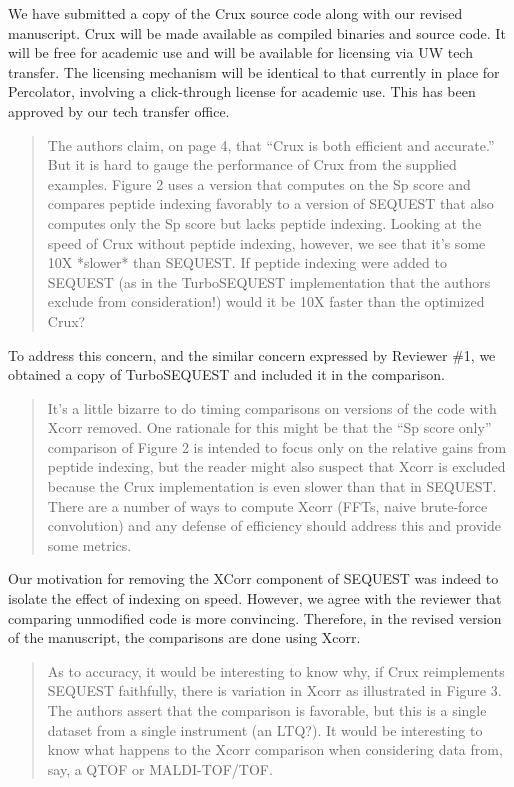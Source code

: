 \documentclass{article}
\newcommand{\breview}{\begin{quotation}\begin{em}\noindent}
\newcommand{\ereview}{\end{em}\end{quotation}}
\begin{document}
We have submitted a copy of the Crux source code along with our
revised manuscript.  Crux will be made available as compiled binaries
and source code.  It will be free for academic use and will be
available for licensing via UW tech transfer.  The licensing mechanism
will be identical to that currently in place for Percolator, involving
a click-through license for academic use.  This has been approved by
our tech transfer office.

\breview The authors claim, on page 4, that ``Crux is both efficient
and accurate.'' But it is hard to gauge the performance of Crux from
the supplied examples. Figure 2 uses a version that computes on the Sp
score and compares peptide indexing favorably to a version of SEQUEST
that also computes only the Sp score but lacks peptide
indexing. Looking at the speed of Crux without peptide indexing,
however, we see that it's some 10X *slower* than SEQUEST. If peptide
indexing were added to SEQUEST (as in the TurboSEQUEST implementation
that the authors exclude from consideration!) would it be 10X faster
than the optimized Crux? \ereview

To address this concern, and the similar concern expressed by Reviewer
\#1, we obtained a copy of TurboSEQUEST and included it in the
comparison.

\breview It's a little bizarre to do timing comparisons on versions of
the code with Xcorr removed. One rationale for this might be that the
``Sp score only'' comparison of Figure 2 is intended to focus only on
the relative gains from peptide indexing, but the reader might also
suspect that Xcorr is excluded because the Crux implementation is even
slower than that in SEQUEST. There are a number of ways to compute
Xcorr (FFTs, naive brute-force convolution) and any defense of
efficiency should address this and provide some metrics. \ereview

Our motivation for removing the XCorr component of SEQUEST was indeed
to isolate the effect of indexing on speed.  However, we agree with
the reviewer that comparing unmodified code is more convincing.
Therefore, in the revised version of the manuscript, the comparisons
are done using Xcorr.

\breview As to accuracy, it would be interesting to know why, if Crux
reimplements SEQUEST faithfully, there is variation in Xcorr as
illustrated in Figure 3. The authors assert that the comparison is
favorable, but this is a single dataset from a single instrument (an
LTQ?). It would be interesting to know what happens to the Xcorr
comparison when considering data from, say, a QTOF or
MALDI-TOF/TOF. 
\ereview
\end{document}
